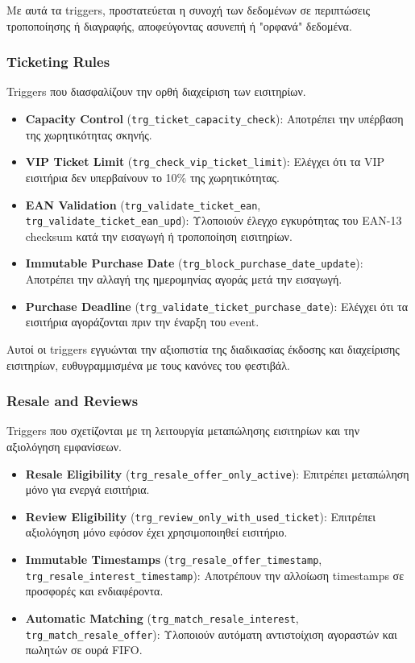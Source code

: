 \documentclass[13pt]{extarticle}
\begin{document}
Με αυτά τα triggers, προστατεύεται η συνοχή των δεδομένων σε περιπτώσεις τροποποίησης ή διαγραφής, αποφεύγοντας ασυνεπή ή "ορφανά" δεδομένα.

\subsubsection{Ticketing Rules}

Triggers που διασφαλίζουν την ορθή διαχείριση των εισιτηρίων.

\begin{itemize}
    \item \textbf{Capacity Control} (\texttt{trg\_ticket\_capacity\_check}): Αποτρέπει την υπέρβαση της χωρητικότητας σκηνής.
    \item \textbf{VIP Ticket Limit} (\texttt{trg\_check\_vip\_ticket\_limit}): Ελέγχει ότι τα VIP εισιτήρια δεν υπερβαίνουν το 10\% της χωρητικότητας.
    \item \textbf{EAN Validation} (\texttt{trg\_validate\_ticket\_ean}, \texttt{trg\_validate\_ticket\_ean\_upd}): Υλοποιούν έλεγχο εγκυρότητας του EAN-13 checksum κατά την εισαγωγή ή τροποποίηση εισιτηρίων.
    \item \textbf{Immutable Purchase Date} (\texttt{trg\_block\_purchase\_date\_update}): Αποτρέπει την αλλαγή της ημερομηνίας αγοράς μετά την εισαγωγή.
    \item \textbf{Purchase Deadline} (\texttt{trg\_validate\_ticket\_purchase\_date}): Ελέγχει ότι τα εισιτήρια αγοράζονται πριν την έναρξη του event.
\end{itemize}

Αυτοί οι triggers εγγυώνται την αξιοπιστία της διαδικασίας έκδοσης και διαχείρισης εισιτηρίων, ευθυγραμμισμένα με τους κανόνες του φεστιβάλ.

\subsubsection{Resale and Reviews}

Triggers που σχετίζονται με τη λειτουργία μεταπώλησης εισιτηρίων και την αξιολόγηση εμφανίσεων.

\begin{itemize}
    \item \textbf{Resale Eligibility} (\texttt{trg\_resale\_offer\_only\_active}): Επιτρέπει μεταπώληση μόνο για ενεργά εισιτήρια.
    \item \textbf{Review Eligibility} (\texttt{trg\_review\_only\_with\_used\_ticket}): Επιτρέπει αξιολόγηση μόνο εφόσον έχει χρησιμοποιηθεί εισιτήριο.
    \item \textbf{Immutable Timestamps} (\texttt{trg\_resale\_offer\_timestamp}, \texttt{trg\_resale\_interest\_timestamp}): Αποτρέπουν την αλλοίωση timestamps σε προσφορές και ενδιαφέροντα.
    \item \textbf{Automatic Matching} (\texttt{trg\_match\_resale\_interest}, \texttt{trg\_match\_resale\_offer}): Υλοποιούν αυτόματη αντιστοίχιση αγοραστών και πωλητών σε ουρά FIFO.
\end{itemize}
\end{document}
